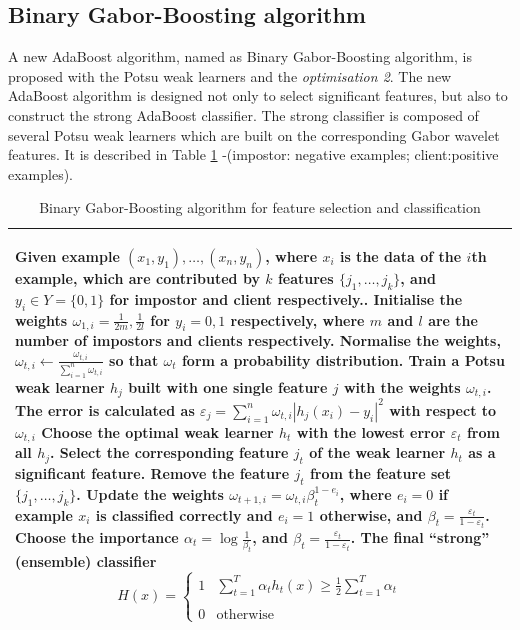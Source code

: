 \subsection{Binary Gabor-Boosting algorithm}
A new AdaBoost algorithm, named as Binary Gabor-Boosting algorithm, is proposed with the Potsu weak learners and the \textit{optimisation 2}. The new AdaBoost algorithm is designed not only to select significant features, but also to construct the strong AdaBoost classifier. The strong classifier is composed of several Potsu weak learners which are built on the corresponding Gabor wavelet features. It is described in \mbox{Table} \ref{tab:binarygaborboosting} -(impostor: negative examples; client:positive examples).
\begin{table}
\caption{Binary Gabor-Boosting algorithm for feature selection and classification}
\begin{tabular}{p{\columnwidth}}
\hline
\begin{algorithmic}[1]
\STATE Given example $(x_{1},y_{1}),\ldots,(x_{n},y_{n})$, where $x_{i}$ is the data of the $i$th example, which are contributed by $k$ features $\{j_{1},\ldots,j_{k}\}$, and $y_{i} \in Y=\{0,1\}$ for impostor and client respectively..
\STATE Initialise the weights $\omega_{1,i}=\frac{1}{2m},\frac{1}{2l}$ for $y_{i}=0,1$ respectively, where $m$ and $l$ are the number of impostors and clients respectively.
\FOR{$t=1,\ldots,T$}
	\STATE Normalise the weights, $\omega_{t,i}\leftarrow\frac{\omega_{t,i}}{\sum_{i=1}^{n}\omega_{t,i}}$ so that $\omega_{t}$ form a probability distribution.
	\FORALL{$\{j_{1},\ldots,j_{k}\}$}
		\STATE Train a  Potsu weak learner $h_{j}$ built with one single feature $j$ with the weights $\omega_{t,i}$.
		\STATE The error is calculated as $\varepsilon_{j}=\sum_{i=1}^{n}\omega_{t,i}|h_{j}(x_{i})-y_{i}|^{2}$ with respect to $\omega_{t,i}$
	\ENDFOR
	\STATE Choose the optimal weak learner $h_{t}$ with the lowest error $\varepsilon_{t}$ from all $h_{j}$.
	\STATE Select the corresponding feature $j_{t}$ of the weak learner $h_{t}$ as a significant feature.
	\STATE Remove the feature $j_{t}$ from the feature set $\{j_{1},\ldots,j_{k}\}$.
	\STATE Update the weights $\omega_{t+1,i}=\omega_{t,i}\beta_{t}^{1-e_{i}}$, where $e_{i}=0$ if example $x_{i}$ is classified correctly and $e_{i}=1$ otherwise, and $\beta_{t}=\frac{\varepsilon_{t}}{1-\varepsilon_{t}}$.
	\STATE Choose the importance $\alpha_{t}=\log\frac{1}{\beta_{t}}$, and $\beta_{t}=\frac{\varepsilon_{t}}{1-\varepsilon_{t}}$.
\ENDFOR
\STATE The final ``strong'' (ensemble) classifier
\begin{displaymath}
 H(x)  = 
		\left\{
		 \begin{array}{ll}
		  1 & \sum_{t=1}^{T}\alpha_{t}h_{t}(x) \geq \frac{1}{2}\sum_{t=1}^{T}\alpha_{t}\\
			\\
		  0 & \textrm{otherwise}
		 \end{array}
		\right. 
\end{displaymath}
\end{algorithmic}\\
\hline
\end{tabular}
\label{tab:binarygaborboosting}
\end{table}
 
